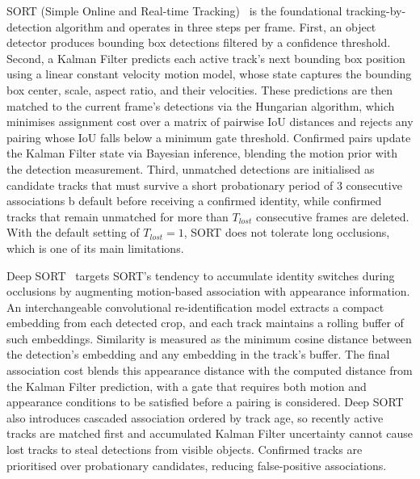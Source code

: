 \documentclass[12pt,oneside,bibtotoc,liststotoc]{scrbook}
\begin{document}
SORT (Simple Online and Real-time Tracking)~\cite{bewley2016SORT} is the foundational tracking-by-detection algorithm
and operates in three steps per frame. First, an object detector produces bounding box detections
filtered by a confidence threshold. Second, a Kalman Filter predicts each active track's next
bounding box position using a linear constant velocity motion model, whose state captures the
bounding box center, scale, aspect ratio, and their velocities. These predictions are then matched
to the current frame's detections via the Hungarian algorithm, which minimises assignment cost over
a matrix of pairwise IoU distances and rejects any pairing whose IoU falls below a minimum gate
threshold. Confirmed pairs update the Kalman Filter state via Bayesian inference, blending the
motion prior with the detection measurement. Third, unmatched detections are initialised as
candidate tracks that must survive a short probationary period of 3 consecutive associations
b default before receiving a confirmed identity, while confirmed tracks that remain unmatched for more
than $T_{lost}$ consecutive frames are deleted. With the default setting of $T_{lost} = 1$, SORT
does not tolerate long occlusions, which is one of its main limitations.
\cite{advzemovic2025deepLearningMultiObjectTrackingSurvey}

Deep SORT~\cite{wojke2017DeepSORT} targets SORT's tendency to accumulate identity switches during occlusions by augmenting
motion-based association with appearance information. An interchangeable convolutional re-identification model extracts
a compact embedding from each detected crop, and each track maintains a rolling buffer
of such embeddings. Similarity is measured as the minimum cosine distance
between the detection's embedding and any embedding in the track's buffer.
The final association cost blends this
appearance distance with the computed distance from the Kalman Filter prediction, with a gate that
requires both motion and appearance conditions to be satisfied before a pairing is considered.
Deep SORT also introduces cascaded association ordered by track age, so recently
active tracks are matched first and accumulated Kalman Filter uncertainty cannot cause lost tracks to
steal detections from visible objects. Confirmed tracks are prioritised over probationary candidates,
reducing false-positive associations.
\cite{advzemovic2025deepLearningMultiObjectTrackingSurvey}
\end{document}

